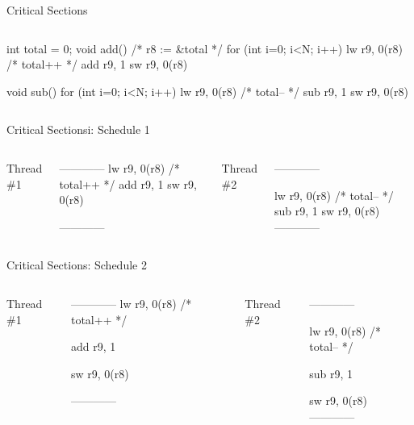 \documentclass[11pt,aspectratio=169]{beamer}
\begin{document}
\begin{slide}{Critical Sections}
\begin{columns}
    \begin{ccode}
int total = 0;
void add() {
    /* r8 := &total */
    for (int i=0; i<N; i++) {
	lw r9, 0(r8) /* total++ */
	add r9, 1
	sw r9, 0(r8)
    }
}

void sub() {
    for (int i=0; i<N; i++) {
	lw r9, 0(r8) /* total-- */
	sub r9, 1
	sw r9, 0(r8)
    }
}
    \end{ccode}
\end{columns}
\end{slide}

\begin{slide}{Critical Sectionsi: Schedule 1}
\begin{columns}
    Thread \#1\\
    \begin{ccode}
------------
lw r9, 0(r8) /* total++ */
add r9, 1
sw r9, 0(r8)



------------
    \end{ccode}
    Thread \#2\\
    \begin{ccode}
------------



lw r9, 0(r8) /* total-- */
sub r9, 1
sw r9, 0(r8)
------------
    \end{ccode}
\end{columns}
\end{slide}

\begin{slide}{Critical Sections: Schedule 2}
\begin{columns}
    Thread \#1\\
    \begin{ccode}
------------
lw r9, 0(r8) /* total++ */

add r9, 1

sw r9, 0(r8)

------------
    \end{ccode}
    Thread \#2\\
    \begin{ccode}
------------

lw r9, 0(r8) /* total-- */

sub r9, 1

sw r9, 0(r8)
------------
    \end{ccode}
\end{columns}
\end{slide}
\end{document}
